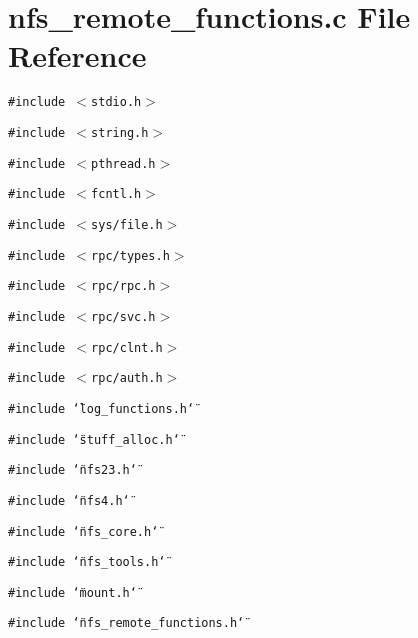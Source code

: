 \section{nfs\_\-remote\_\-functions.c File Reference}
\label{nfs__remote__functions_8c}
{\tt \#include $<$stdio.h$>$}\par
{\tt \#include $<$string.h$>$}\par
{\tt \#include $<$pthread.h$>$}\par
{\tt \#include $<$fcntl.h$>$}\par
{\tt \#include $<$sys/file.h$>$}\par
{\tt \#include $<$rpc/types.h$>$}\par
{\tt \#include $<$rpc/rpc.h$>$}\par
{\tt \#include $<$rpc/svc.h$>$}\par
{\tt \#include $<$rpc/clnt.h$>$}\par
{\tt \#include $<$rpc/auth.h$>$}\par
{\tt \#include \char`\"{}log\_\-functions.h\char`\"{}}\par
{\tt \#include \char`\"{}stuff\_\-alloc.h\char`\"{}}\par
{\tt \#include \char`\"{}nfs23.h\char`\"{}}\par
{\tt \#include \char`\"{}nfs4.h\char`\"{}}\par
{\tt \#include \char`\"{}nfs\_\-core.h\char`\"{}}\par
{\tt \#include \char`\"{}nfs\_\-tools.h\char`\"{}}\par
{\tt \#include \char`\"{}mount.h\char`\"{}}\par
{\tt \#include \char`\"{}nfs\_\-remote\_\-functions.h\char`\"{}}\par
